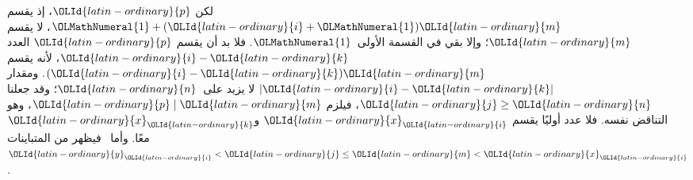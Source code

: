 \documentclass[../../../include/open-logic-section]{subfiles}
\begin{document}
لكن ${\OLId{latin-ordinary}{p}}$، إذ يقسم ${\OLMathNumeral{1}}+({\OLId{latin-ordinary}{i}}+{\OLMathNumeral{1}}){\OLId{latin-ordinary}{m}}$، لا يقسم ${\OLId{latin-ordinary}{m}}$؛ وإلا بقي في القسمة
الأولى~${\OLMathNumeral{1}}$. فلا بد أن يقسم ${\OLId{latin-ordinary}{p}}$ العدد ${\OLId{latin-ordinary}{i}}-{\OLId{latin-ordinary}{k}}$، لأنه يقسم
$({\OLId{latin-ordinary}{i}}-{\OLId{latin-ordinary}{k}}){\OLId{latin-ordinary}{m}}$. ومقدار $\left|{\OLId{latin-ordinary}{i}}-{\OLId{latin-ordinary}{k}}\right|$ لا يزيد على~${\OLId{latin-ordinary}{n}}$؛ وقد جعلنا
${\OLId{latin-ordinary}{j}}\geq {\OLId{latin-ordinary}{n}}$، فيلزم ${\OLId{latin-ordinary}{p}}\mid {\OLId{latin-ordinary}{m}}$، وهو التناقض نفسه.
فلا عدد أوليًا يقسم ${\OLId{latin-ordinary}{x}}_{\OLId{latin-ordinary}{i}}$ و${\OLId{latin-ordinary}{x}}_{\OLId{latin-ordinary}{k}}$ معًا.
وأما~ فيظهر من المتباينات ${\OLId{latin-ordinary}{y}}_{\OLId{latin-ordinary}{i}}<{\OLId{latin-ordinary}{j}}\leq {\OLId{latin-ordinary}{m}}<{\OLId{latin-ordinary}{x}}_{\OLId{latin-ordinary}{i}}$.
\end{document}

